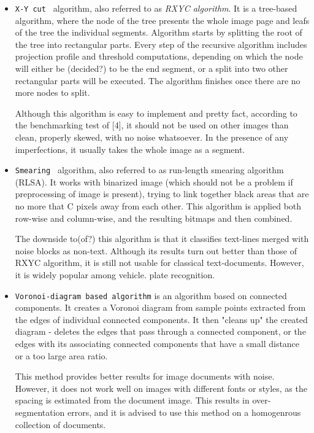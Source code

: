 \begin{itemize}
\item\texttt{X-Y cut } algorithm, also referred to as \emph{RXYC algorithm}. It is a tree-based algorithm, where the node of the tree presents the whole image page and leafs of the tree the individual segments. Algorithm starts by splitting the root of the tree into rectangular parts. Every step of the recursive algorithm includes projection profile and threshold computations, depending on which the node will either be (decided?) to be the end segment, or a split into two other rectangular parts will be executed. The algorithm finishes once there are no more nodes to split.

Although this algorithm is easy to implement and pretty fact, according to the benchmarking test of [4], it should not be used on other images than clean, properly skewed, with no noise whatsoever. In the presence of any imperfections, it usually takes the whole image as a segment.

\item\texttt{Smearing } algorithm, also referred to as run-length smearing algorithm (RLSA). It works with binarized image (which should not be a problem if preprocessing of image is present), trying to link together black areas that are no more that C pixels away from each other. This algorithm is applied both row-wise and column-wise, and the resulting bitmaps and then combined.

The downside to(of?) this algorithm is that it classifies text-lines merged with noise blocks as non-text. Although its results turn out better than those of RXYC algorithm, it is still not usable for classical text-documents. However, it is widely popular among vehicle. plate recognition.

\item\texttt{Voronoi-diagram based algorithm} is an algorithm based on connected components. It creates a Voronoi diagram from sample points extracted from the edges of individual connected components. It then "cleans up" the created diagram - deletes the edges that pass through a connected component, or the edges with its associating connected components that have a small distance or a too large area ratio.

This method provides better results for image documents with noise. However, it does not work well on images with different fonts or styles, as the spacing is estimated from the document image. This results in over-segmentation errors, and it is advised to use this method on a homogenrous collection of documents.


\end{itemize}
